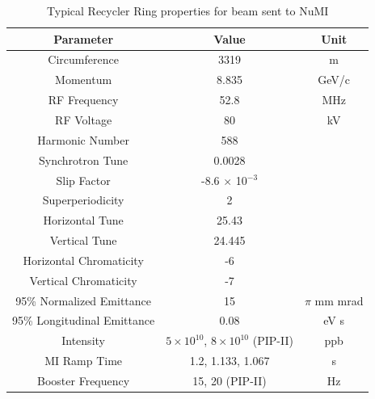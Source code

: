 \begin{table}[H]
\centering
\caption{Typical Recycler Ring properties for beam sent to NuMI}
\label{tab:rrparams}
\begin{tabular}{@{}ccc@{}}
\toprule
\textbf{Parameter}          & \textbf{Value}                             & \textbf{Unit} \\ \midrule
Circumference               & 3319                                       & m             \\
Momentum                    & 8.835                                      & GeV/c         \\
RF Frequency                & 52.8                                       & MHz           \\
RF Voltage                  & 80                                         & kV            \\
Harmonic Number             & 588                                        &               \\
Synchrotron Tune            & 0.0028                                     &               \\
Slip Factor                 & -8.6 $\times$ 10$^{-3}$                    &               \\
Superperiodicity            & 2                                          &               \\
Horizontal Tune             & 25.43                                      &               \\
Vertical Tune               & 24.445                                     &               \\
Horizontal Chromaticity     & -6                                         &               \\
Vertical Chromaticity       & -7                                         &               \\
95\% Normalized Emittance   & 15                                         & $\pi$ mm mrad \\
95\% Longitudinal Emittance & 0.08                                       & eV s          \\
Intensity                   & $5\times10^{10}$, $8\times10^{10}$ (PIP-II) & ppb           \\
MI Ramp Time                & 1.2, 1.133, 1.067                        & s             \\
Booster Frequency           & 15, 20 (PIP-II)                            & Hz            \\ \bottomrule
\end{tabular}
\end{table}

